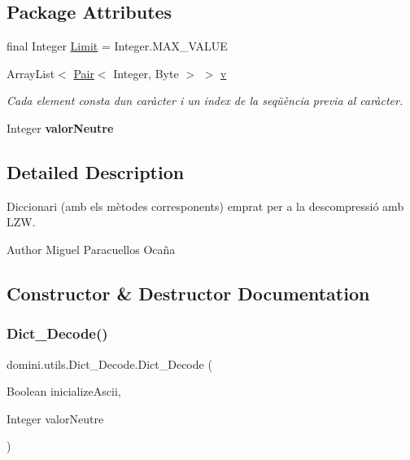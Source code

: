 \subsection*{Package Attributes}
\begin{DoxyCompactItemize}
\item 
final Integer \hyperlink{classdomini_1_1utils_1_1Dict__Decode_a10fd6693de70b9091942496b35324c5a}{Limit} = Integer.\+M\+A\+X\+\_\+\+V\+A\+L\+UE
\item 
Array\+List$<$ \hyperlink{classdomini_1_1utils_1_1Pair}{Pair}$<$ Integer, Byte $>$ $>$ \hyperlink{classdomini_1_1utils_1_1Dict__Decode_a351bb8836b391e5e21ebc9cc1943a22d}{v}
\begin{DoxyCompactList}\small\item\em Cada element consta d\textquotesingle{}un caràcter i un index de la seqüència previa al caràcter. \end{DoxyCompactList}\item 
\mbox{\label{classdomini_1_1utils_1_1Dict__Decode_a6ef2d17f449cf7a658a4bf983e2fb474}} 
Integer {\bfseries valor\+Neutre}
\end{DoxyCompactItemize}


\subsection{Detailed Description}
Diccionari (amb els mètodes corresponents) emprat per a la descompressió amb L\+ZW. 

\begin{DoxyAuthor}{Author}
Miguel Paracuellos Ocaña 
\end{DoxyAuthor}


\subsection{Constructor \& Destructor Documentation}
\mbox{\label{classdomini_1_1utils_1_1Dict__Decode_a8a0f9e67c530bafc031e72c218ce74f8}} 
\subsubsection{\texorpdfstring{Dict\+\_\+\+Decode()}{Dict\_Decode()}}
{\footnotesize\ttfamily domini.\+utils.\+Dict\+\_\+\+Decode.\+Dict\+\_\+\+Decode (\begin{DoxyParamCaption}\item[{Boolean}]{inicialize\+Ascii,  }\item[{Integer}]{valor\+Neutre }\end{DoxyParamCaption})\hspace{0.3cm}{\ttfamily [inline]}}



